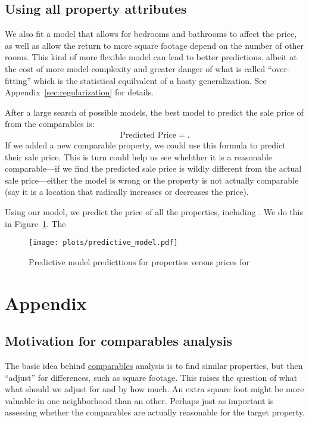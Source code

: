\documentclass[
12pt, %
letterpaper, %
oneside, %
headinclude,footinclude, %
BCOR5mm, %
]{scrartcl}
\begin{document}
\subsection{Using all property attributes}
We also fit a model that allows for bedrooms and bathrooms to affect the price, as well as allow the return to more square footage depend on the number of other rooms.
This kind of more flexible model can lead to better predictions. albeit at the cost of more model complexity and greater danger of what is called ``over-fitting'' which is the statistical equilvalent of a hasty generalization.
See Appendix~\ref{sec:regularization} for details. 

After a large search of possible models, the best model to predict the sale price of \PropertyName{} from the comparables is: 
\begin{align}
\mbox{Predicted Price} = .
\end{align}
If we added a new comparable property, we could use this formula to predict their sale price.
This is turn could help us see whehther it is a reasonable comparable---if we find the predicted sale price is wildly different from the actual sale price---either the model is wrong or the property is not actually comparable (say it is a location that radically increases or decreases the price). 

Using our model, we predict the price of all the properties, including \PropertyName{}.
We do this in Figure~\ref{fig:predictive_model}.
The 

\begin{figure}
\centering
\caption{Predictive model predicttions for properties versus prices for \PropertyName{}} \label{fig:predictive_model}  
\texttt{[image: plots/predictive\_model.pdf]} 
\end{figure}

\renewcommand{\refname}{\spacedlowsmallcaps{References}} %


\pagebreak

\appendix

\section{Appendix} 

\subsection{Motivation for comparables analysis} \label{sec:methods}
The basic idea behind \href{https://en.wikipedia.org/wiki/Comparables}{comparables} analysis is to find similar properties, but then ``adjust'' for differences, such as square footage.
This raises the question of what what should we adjust for and by how much.
An extra square foot might be more valuable in one neighborhood than an other. 
Perhaps just as important is assessing whether the comparables are actually reasonable for the target property. 
\end{document}
